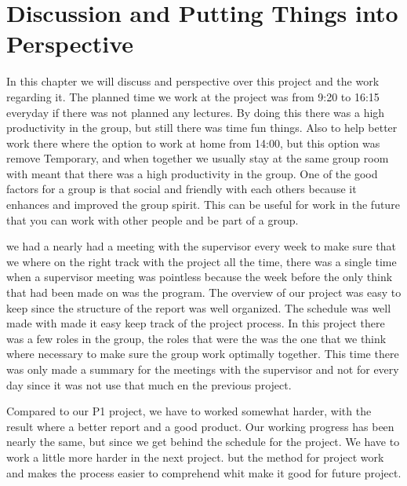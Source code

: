 \chapter{Discussion and Putting Things into Perspective}
In this chapter we will discuss and perspective over this project and the work regarding it.
The planned time we work at the project was from 9:20 to 16:15 everyday if there was not planned any lectures. By doing this there was a high productivity in the group, but still there was time fun things. Also to help better work there where the option to work at home from 14:00, but this option was remove Temporary, 
and when together we usually stay at the same group room with meant that there was a high productivity in the group.
One of the good factors for a group is that social and friendly with each others because it enhances and improved the group spirit.
This can be useful for work in the future that you can work with other people and be part of a group.

we had a nearly had a meeting with the supervisor every week to make sure that we where on the right track with the project all the time, there was a single time when a supervisor meeting was pointless because the week before the only think that had been made on was the program. The overview of our project was easy to keep since the structure of the report was well organized. The schedule was well made with made it easy keep track of the project process. In this project there was a few roles in the group, the roles that were the was the one that we think where necessary to make sure the group work optimally together. This time there was only made a summary for the meetings with the supervisor and not for every day since it was not use that much en the previous project. 

Compared to our P1 project, we have to worked somewhat harder, with the result where a better report and a good product. Our working progress has been nearly the same, but since we get behind the schedule for the project. We have to work a little more harder in the next project. but the method for project work and makes the process easier to comprehend whit make it good for future project.